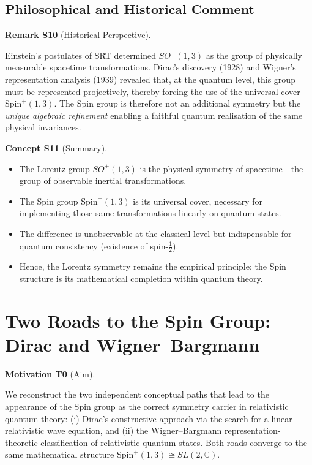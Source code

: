 \documentclass[10pt, letterpaper]{article}
\newcommand{\C}{\mathbb{C}}
\newcommand{\Spin}{\mathrm{Spin}}
\newcommand{\CustomHeading}[3]{%
  \par\medskip\noindent%
  \textbf{#1 #2} \textnormal{(#3)}.\enskip%
}
\newenvironment{REM}[2]{\begin{unitbox}\CustomHeading{Remark}{#1}{#2}}{\end{unitbox}}
\newenvironment{CONC}[2]{\begin{unitbox}\CustomHeading{Concept}{#1}{#2}}{\end{unitbox}}
\newenvironment{MOT}[2]{\begin{unitbox}\CustomHeading{Motivation}{#1}{#2}}{\end{unitbox}}
\begin{document}
\subsection{Philosophical and Historical Comment}

\begin{REM}{S10}{Historical Perspective}
Einstein’s postulates of SRT determined $SO^+(1,3)$ as the group of physically measurable spacetime transformations.  
Dirac’s discovery (1928) and Wigner’s representation analysis (1939) revealed that, at the quantum level, this group must be represented projectively, thereby forcing the use of the universal cover $\Spin^+(1,3)$.  
The Spin group is therefore not an additional symmetry but the \emph{unique algebraic refinement} enabling a faithful quantum realisation of the same physical invariances.
\end{REM}

\begin{CONC}{S11}{Summary}
\begin{itemize}
\item The Lorentz group $SO^+(1,3)$ is the physical symmetry of spacetime—the group of observable inertial transformations.
\item The Spin group $\Spin^+(1,3)$ is its universal cover, necessary for implementing those same transformations linearly on quantum states.
\item The difference is unobservable at the classical level but indispensable for quantum consistency (existence of spin-$\tfrac12$).  
\item Hence, the Lorentz symmetry remains the empirical principle; the Spin structure is its mathematical completion within quantum theory.
\end{itemize}
\end{CONC}


\pagebreak


\section{Two Roads to the Spin Group: Dirac and Wigner–Bargmann}

\begin{MOT}{T0}{Aim}
We reconstruct the two independent conceptual paths that lead to the appearance of the Spin group as the correct symmetry carrier in relativistic quantum theory:  
(i) Dirac’s constructive approach via the search for a linear relativistic wave equation, and  
(ii) the Wigner–Bargmann representation-theoretic classification of relativistic quantum states.  
Both roads converge to the same mathematical structure $\Spin^+(1,3)\cong SL(2,\C)$.
\end{MOT}
\end{document}
